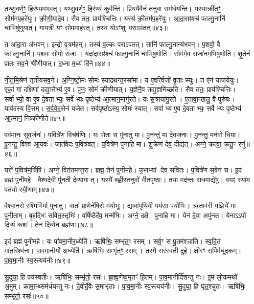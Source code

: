 तथ्सु॒वर्ण॒ꣳ॒ हिर॑ण्यमभवत्।
यथ्सु॒वर्ण॒ꣳ॒ हिर॑ण्यं कु॒र्वन्ति॑।
प्रि॒ययै॒वैनं॑ त॒नुवा॒ सम॑र्धयन्ति।
यस्याक्री॑त॒ꣳ॒ सोम॑मप॒हरे॑युः।
क्री॒णी॒यादे॒व।
सैव ततः॒ प्राय॑श्चित्तिः।
यस्य॑ क्री॒तम॑प॒हरे॑युः।
आ॒दा॒राꣴश्च॑ फाल्गु॒नानि॑ चा॒भिषु॑णुयात्।
गा॒य॒त्री यꣳ सोम॒माह॑रत्।
तस्य॒ योऽꣳ॑शुः प॒रा\-ऽप॑तत्॥४३॥

त आ॑दा॒रा अ॑भवन्।
इन्द्रो॑ वृ॒त्रम॑हन्।
तस्य॑ व॒ल्कः परा॑\-ऽपतत्।
तानि॑ फाल्गु॒नान्य॑भवन्।
प॒शवो॒ वै फाल्गु॒नानि॑।
प॒शवः॒ सोमो॒ राजा।
यदा॑दा॒राꣴश्च॑ फाल्गु॒नानि॑ चाभिषु॒णोति॑।
सोम॑मे॒व राजा॑नम॒भिषु॑णोति।
शृ॒तेन॑ प्रातः सव॒ने श्री॑णीयात्।
द॒ध्ना म॒ध्यं दि॑ने॥४४॥

नी॒त॒मि॒श्रेण॑ तृतीयसव॒ने।
अ॒ग्नि॒ष्टो॒मः सोमः॑ स्याद्रथन्त॒र\-सा॑मा।
य ए॒वर्त्विजो॑ वृ॒ताः स्युः।
त ए॑नं याजयेयुः।
एकां॒ गां दक्षि॑णां दद्या॒त्तेभ्य॑ ए॒व।
पुनः॒ सोमं॑ क्रीणीयात्।
य॒ज्ञेनै॒व तद्य॒ज्ञमि॑च्छति।
सैव ततः॒ प्राय॑श्चित्तिः।
सर्वाभ्यो॒ वा ए॒ष दे॒वताभ्यः॒ सर्वेभ्यः पृ॒ष्ठेभ्य॑ आ॒त्मान॒मागु॑रते।
यः स॒त्राया॑गु॒रते।
ए॒तावा॒न्खलु॒ वै पुरु॑षः।
याव॑दस्य वि॒त्तम्।
स॒र्व॒वे॒द॒सेन॑ यजेत।
सर्व॑पृष्ठो\-ऽस्य॒ सोमः॑ स्यात्।
सर्वाभ्य ए॒व दे॒वताभ्यः॒ सर्वेभ्यः पृ॒ष्ठेभ्य॑ आ॒त्मानं॒ निष्क्री॑णीते॥४५॥\anuvakamend[उ॒द्वाय॑ति मन्थेन्मन्थत्यक्रामत्प॒रा\-ऽप॑तन्म॒ध्यन्दि॑न आगु॒रते॒ पञ्च॑ च]

पव॑मानः॒ सुव॒र्जनः॑।
प॒वित्रे॑ण॒ विच॑र्\mbox{}षणिः।
यः पोता॒ स पु॑नातु मा।
पु॒नन्तु॑ मा देवज॒नाः।
पु॒नन्तु॒ मन॑वो धि॒या।
पु॒नन्तु॒ विश्व॑ आ॒यवः॑।
जात॑वेदः प॒वित्र॑वत्।
प॒वित्रे॑ण पुनाहि मा।
शु॒क्रेण॑ देव॒ दीद्य॑त्।
अग्ने॒ क्रत्वा॒ क्रतू॒ꣳ रनु॑॥४६॥

यत्ते॑ प॒वित्र॑म॒र्चिषि॑।
अग्ने॒ वित॑तमन्त॒रा।
ब्रह्म॒ तेन॑ पुनीमहे।
उ॒भाभ्यां देव सवितः।
प॒वित्रे॑ण स॒वेन॑ च।
इ॒दं ब्रह्म॑ पुनीमहे।
वै॒श्व॒दे॒वी पु॑न॒ती दे॒व्यागात्।
यस्यै॑ ब॒ह्वीस्त॒नुवो॑ वी॒तपृ॑ष्ठाः।
तया॒ मद॑न्तः सध॒माद्ये॑षु।
व॒यꣴ स्या॑म॒ पत॑यो रयी॒णाम्॥४७॥

वै॒श्वा॒न॒रो र॒श्मिभि॑र्मा पुनातु।
वातः॑ प्रा॒णेने॑षि॒रो म॑यो॒भूः।
द्यावा॑पृथि॒वी पय॑सा॒ पयो॑भिः।
ऋ॒ताव॑री य॒ज्ञिये॑ मा पुनीताम्।
बृ॒हद्भिः॑ सवित॒स्तृभिः॑।
वर्\mbox{}षि॑ष्ठैर्देव॒ मन्म॑भिः।
अग्ने॒ दक्षै पुनाहि मा।
येन॑ दे॒वा अपु॑नत।
येनाऽऽपो॑ दि॒व्यं कशः॑।
तेन॑ दि॒व्येन॒ ब्रह्म॑णा॥४८॥

इ॒दं ब्रह्म॑ पुनीमहे।
यः पा॑वमा॒नीर॒ध्येति॑।
ऋषि॑भिः॒ सम्भृ॑त॒ꣳ॒ रसम्।
सर्व॒ꣳ॒ स पू॒तम॑श्ञाति।
स्व॒दि॒तं मा॑त॒रिश्व॑ना।
पा॒व॒मा॒नीर्यो अ॒ध्येति॑।
ऋषि॑भिः॒ सम्भृ॑त॒ꣳ॒ रसम्।
तस्मै॒ सर॑स्वती दुहे।
क्षी॒रꣳ स॒र्पिर्मधू॑द॒कम्।
पा॒व॒मा॒नीः स्व॒स्त्यय॑नीः॥४९॥

सु॒दुघा॒ हि पय॑स्वतीः।
ऋषि॑भिः॒ सम्भृ॑तो॒ रसः॑।
ब्रा॒ह्म॒णेष्व॒मृतꣳ॑ हि॒तम्।
पा॒व॒मानीर्दि॑शन्तु नः।
इ॒मं लो॒कमथो॑ अ॒मुम्।
कामा॒न्थ्सम॑र्धयन्तु नः।
दे॒वीर्दे॒वैः स॒माभृ॑ताः।
पा॒व॒मा॒नीः स्व॒स्त्यय॑नीः।
सु॒दुघा॒ हि घृ॑त॒श्चुतः॑।
ऋषि॑भिः॒ सम्भृ॑तो॒ रसः॑॥५०॥

